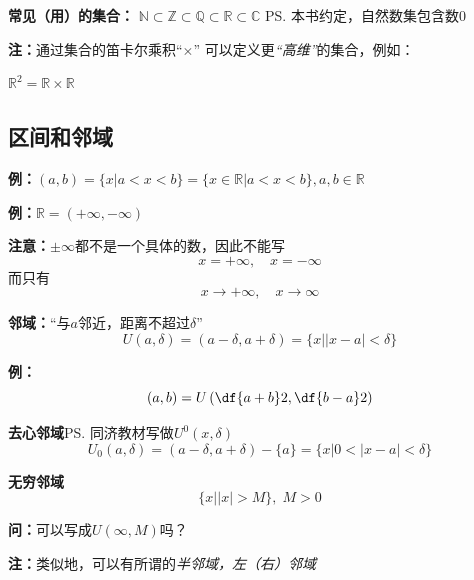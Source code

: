 {\bf 常见（用）的集合：}
$\mathbb{N}\subset\mathbb{Z}\subset\mathbb{Q}\subset\mathbb{R}\subset\mathbb{C}$
\ps{本书约定，自然数集包含数$0$}
	
{\bf 注：}通过集合的笛卡尔乘积“$\times$” 可以定义更{\it “高维”}的集合，例如：\\
	\centerline{$\mathbb{R}^2=\mathbb{R}\times\mathbb{R}$}

\subsection{区间和邻域}

{\bf 例：}$(a,b)=\{x|a<x<b\}=\{x\in\mathbb{R}|a<x<b\},a,b\in\mathbb{R}$

{\bf 例：}$\mathbb{R}=(+\infty,-\infty)$

{\bf 注意：}$\pm\infty$都不是一个具体的数，因此不能写
$$x=+\infty,\quad x=-\infty$$
而只有
$$x\to+\infty,\quad x\to\infty$$

{\bf 邻域：}“与$a$邻近，距离不超过$\delta$”
$$U(a,\delta)=(a-\delta,a+\delta)=\{x||x-a|<\delta\}$$

{\bf 例：}
$$(a,b)=U\left(\df{a+b}2,\df{b-a}2\right)$$

{\bf 去心邻域}\ps{同济教材写做$U^0(x,\delta)$}
$$U_0(a,\delta)=(a-\delta,a+\delta)-\{a\}=\{x|0<|x-a|<\delta\}$$

{\bf 无穷邻域}
$$\{x||x|>M\},\;M>0$$

{\bf 问：}可以写成$U(\infty,M)$吗？

{\bf 注：}类似地，可以有所谓的{\it 半邻域，左（右）邻域}

